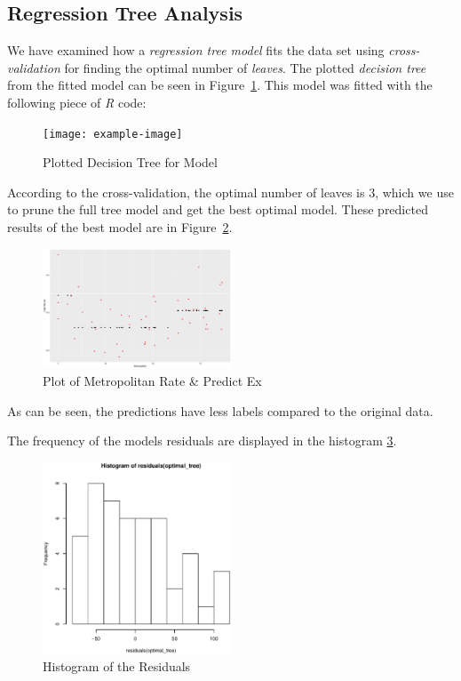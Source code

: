 \documentclass[a4paper, twocolumn]{article}
\begin{document}
    \subsection*{Regression Tree Analysis}

        We have examined how a \emph{regression tree model} fits the data set using \emph{cross-validation} for finding the optimal number of \emph{leaves}. The plotted \emph{decision tree} from the fitted model can be seen in Figure~\ref{fig:tree}. This model was fitted with the following piece of \emph{R} code:

        

        \begin{figure}[h!]
            \centering
            \caption{Plotted Decision Tree for Model}
            \label{fig:tree}
            \texttt{[image: example-image]}
        \end{figure}

        According to the cross-validation, the optimal number of leaves is 3, which we use to prune the full tree model and get the best optimal model. These predicted results of the best model are in Figure~\ref{fig:predicted}.

        \begin{figure}[h!]
            \centering
            \caption{Plot of Metropolitan Rate \& Predict Ex}
            \label{fig:predicted}
            \includegraphics[width=0.5\textwidth]{share/A1_fit.eps}
        \end{figure}

        As can be seen, the predictions have less labels compared to the original data.

        The frequency of the models residuals are displayed in the histogram \ref{fig:residuals}.

        \begin{figure}[h!]
            \centering
            \caption{Histogram of the Residuals}
            \label{fig:residuals}
            \includegraphics[width=0.5\textwidth]{share/A1_historgram_residuals.eps}
        \end{figure}
\end{document}
